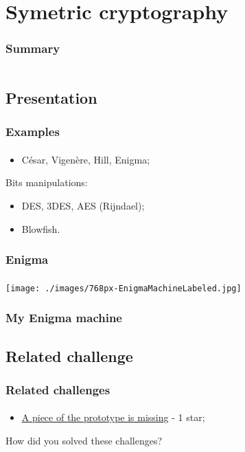 \documentclass[]{beamer}
\begin{document}
%
%
\section{Symetric cryptography}
\begin{frame}
    \frametitle{Summary}
    \begin{columns}[t]
        \begin{column}{5cm}
            \tableofcontents[sections={1-3}, currentsection, hideothersubsections]
        \end{column}
        \begin{column}{5cm}
            \tableofcontents[sections={4-5}, currentsection, hideothersubsections]
        \end{column}
    \end{columns}
\end{frame}
\subsection{Presentation}
\begin{frame}
\frametitle{Examples}
\framesubtitle{}
\begin{itemize}
    \item César, Vigenère, Hill, Enigma;
\end{itemize}
Bits manipulations:
\begin{itemize}
    \item DES, 3DES, AES (Rijndael);
    \item Blowfish.
\end{itemize}

\end{frame}


\begin{frame}
\frametitle{Enigma}
\framesubtitle{}
\begin{center}
\texttt{[image: ./images/768px-EnigmaMachineLabeled.jpg]}
\end{center}
\end{frame}

\begin{frame}
\frametitle{My Enigma machine}
\framesubtitle{}

\end{frame}


\subsection{Related challenge}
\begin{frame}
\frametitle{Related challenges}
\framesubtitle{}
\begin{itemize}
    \item \href{https://github.com/cscluxembourg/vestatech/tree/master/challenges/the-missing-piece}{A piece of the prototype is missing} - 1 star;
\end{itemize}
\bigskip
How did you solved these challenges?
\end{frame}
\end{document}
